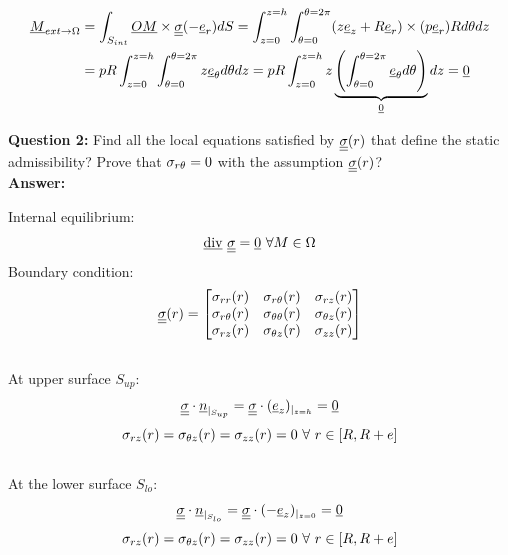 \documentclass[letter,12pt]{article}
\begin{document}
\begin{equation}
\begin{split}
\underline{M}_{ext\rightarrow \Omega} & =  \int_{S_{int}} \underline{OM} \times \underline{\underline{\sigma}}(-\underline{e}_r) dS = \int_{z=0}^{z=h} \int_{\theta = 0}^{\theta = 2\pi} (z \underline{e}_z + R \underline{e}_r) \times (p \underline{e}_r) R d\theta dz \\
&  = pR \int_{z=0}^{z=h} \int_{\theta = 0}^{\theta = 2\pi} z \underline{e}_{\theta} d\theta dz = pR \int_{z=0}^{z=h} z \underbrace{\left(\int_{\theta =0}^{\theta = 2\pi} \underline{e}_{\theta} d\theta \right)}_{\underline{0}} dz = \underline{0}
\end{split}
\end{equation}


\noindent \textbf{Question 2:} Find all the local equations satisfied by $\underline{\underline{\sigma}}(r)$ that define the static admissibility? Prove that $\sigma_{r\theta} = 0$ with the assumption $\underline{\underline{\sigma}}(r)$? \\

\textbf{Answer:} 

Internal equilibrium: 
\begin{equation}
 \underline{\text{div}}  \text{ } \underline{\underline{\sigma}} = \underline{0} \text{ } \forall M \in \Omega 
\end{equation}
Boundary condition:
\begin{equation}
\underline{\underline{\sigma}} (r) = \left[ \begin{matrix}
\sigma_{rr}(r) & \sigma_{r\theta}(r) & \sigma_{rz}(r) \\
\sigma_{r\theta}(r) & \sigma_{\theta\theta}(r) & \sigma_{\theta z}(r)  \\
\sigma_{rz}(r) & \sigma_{\theta z}(r) & \sigma_{zz}(r) 
\end{matrix}\right]
\end{equation} \\

At upper surface $S_{up}$:
\begin{equation}
\underline{\underline{\sigma}} \cdot \underline{n}_{|_{S_{up}}} = \underline{\underline{\sigma}} \cdot (\underline{e}_z)_{|_{z=h}} = \underline{0} 
\end{equation}
\begin{equation}
\sigma_{rz}(r) = \sigma_{\theta z}(r) = \sigma_{zz} (r) = 0 \text{ } \forall \text{ } r \in [R,R+e]
\end{equation} \\


At the lower surface $S_{lo}$:
\begin{equation}
\underline{\underline{\sigma}} \cdot \underline{n}_{|_{S_{lo}}} = \underline{\underline{\sigma}} \cdot (-\underline{e}_z)_{|_{z=0}} = \underline{0} 
\end{equation}
\begin{equation}
\sigma_{rz}(r) = \sigma_{\theta z}(r) = \sigma_{zz} (r) = 0 \text{ } \forall \text{ } r \in [R,R+e]
\end{equation} \\
\end{document}
